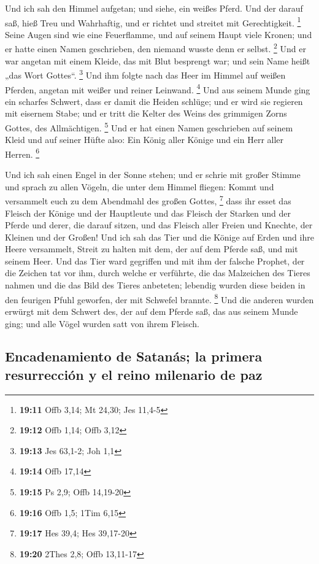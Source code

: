  Und ich sah den Himmel aufgetan; und siehe, ein weißes
Pferd. Und der darauf saß, hieß Treu und Wahrhaftig, und er richtet und
streitet mit Gerechtigkeit. \footnote{\textbf{19:11} Offb 3,14; Mt
  24,30; Jes 11,4-5}  Seine Augen sind wie eine
Feuerflamme, und auf seinem Haupt viele Kronen; und er hatte einen Namen
geschrieben, den niemand wusste denn er selbst. \footnote{\textbf{19:12}
  Offb 1,14; Offb 3,12}  Und er war angetan mit einem
Kleide, das mit Blut besprengt war; und sein Name heißt „das Wort
Gottes``. \footnote{\textbf{19:13} Jes 63,1-2; Joh 1,1} 
Und ihm folgte nach das Heer im Himmel auf weißen Pferden, angetan mit
weißer und reiner Leinwand. \footnote{\textbf{19:14} Offb 17,14}
 Und aus seinem Munde ging ein scharfes Schwert, dass er
damit die Heiden schlüge; und er wird sie regieren mit eisernem Stabe;
und er tritt die Kelter des Weins des grimmigen Zorns Gottes, des
Allmächtigen. \footnote{\textbf{19:15} Ps 2,9; Offb 14,19-20}
 Und er hat einen Namen geschrieben auf seinem Kleid und
auf seiner Hüfte also: Ein König aller Könige und ein Herr aller Herren.
\footnote{\textbf{19:16} Offb 1,5; 1Tim 6,15}

 Und ich sah einen Engel in der Sonne stehen; und er
schrie mit großer Stimme und sprach zu allen Vögeln, die unter dem
Himmel fliegen: Kommt und versammelt euch zu dem Abendmahl des großen
Gottes, \footnote{\textbf{19:17} Hes 39,4; Hes 39,17-20} 
dass ihr esset das Fleisch der Könige und der Hauptleute und das Fleisch
der Starken und der Pferde und derer, die darauf sitzen, und das Fleisch
aller Freien und Knechte, der Kleinen und der Großen! 
Und ich sah das Tier und die Könige auf Erden und ihre Heere versammelt,
Streit zu halten mit dem, der auf dem Pferde saß, und mit seinem Heer.
 Und das Tier ward gegriffen und mit ihm der falsche
Prophet, der die Zeichen tat vor ihm, durch welche er verführte, die das
Malzeichen des Tieres nahmen und die das Bild des Tieres anbeteten;
lebendig wurden diese beiden in den feurigen Pfuhl geworfen, der mit
Schwefel brannte. \footnote{\textbf{19:20} 2Thes 2,8; Offb 13,11-17}
 Und die anderen wurden erwürgt mit dem Schwert des, der
auf dem Pferde saß, das aus seinem Munde ging; und alle Vögel wurden
satt von ihrem Fleisch.

\hypertarget{encadenamiento-de-satanuxe1s-la-primera-resurrecciuxf3n-y-el-reino-milenario-de-paz}{%
\subsection{Encadenamiento de Satanás; la primera resurrección y el
reino milenario de
paz}\label{encadenamiento-de-satanuxe1s-la-primera-resurrecciuxf3n-y-el-reino-milenario-de-paz}}

